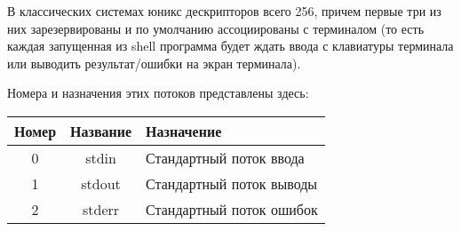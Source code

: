 В классических системах юникс дескрипторов всего 256, причем первые три из них зарезервированы и по умолчанию ассоциированы с терминалом (то есть каждая запущенная из shell программа будет ждать ввода с клавиатуры терминала или выводить результат/ошибки на экран терминала).

Номера и назначения этих потоков представлены здесь:

\begin{center}
\begin{tabular}{c|c|l}
	\textbf{Номер} & \textbf{Название} & \textbf{Назначение} \\
	\hline
	0	&	stdin	&	Стандартный поток ввода \\
	\hline
	1	&	stdout	&	Стандартный поток выводы \\
	\hline
	2	&	stderr	&	Стандартный поток ошибок \\
	\hline
\end{tabular}
\end{center}